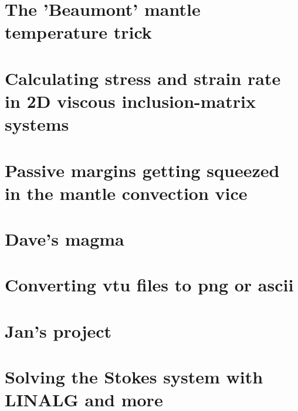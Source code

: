 \documentclass[a4paper,11pt]{report}
\begin{document}
\chapter{The 'Beaumont' mantle temperature trick \label{f141}} %

\chapter{Calculating stress and strain rate in 2D viscous inclusion-matrix systems \label{f142}} %

\chapter{Passive margins getting squeezed in the mantle convection vice \label{f143}} %

\chapter{Dave's magma \label{f144}} %

\chapter{Converting vtu files to png or ascii \label{f145}} %

\chapter{Jan's project \label{f146}} %

\chapter{Solving the Stokes system with LINALG and more} %
\end{document}
